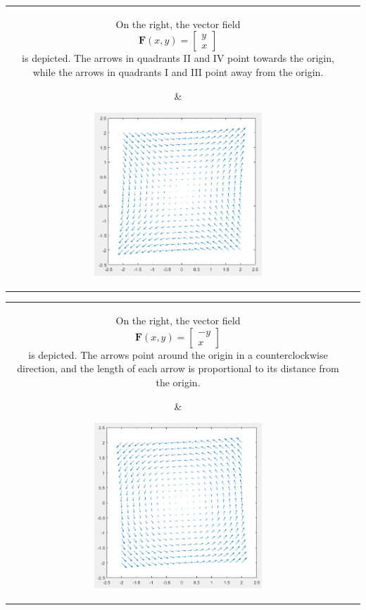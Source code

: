 \documentclass{article}
\begin{document}
\begin{tabular}{cc}
\parbox{0.5\textwidth}{
On the right, the vector field
\[\mathbf{F}(x,y) = \begin{bmatrix} y \\ x \end{bmatrix}\]
is depicted. The arrows in quadrants II and IV point towards the origin, while the arrows in quadrants I and III point away from the origin. 
} & \parbox{0.5\textwidth}{
\includegraphics[width = 0.5\textwidth]{example_vector_field_4}
}
\end{tabular}

\begin{tabular}{cc}
\parbox{0.5\textwidth}{
On the right, the vector field
\[\mathbf{F}(x,y) = \begin{bmatrix} -y \\ x \end{bmatrix}\]
is depicted. The arrows point around the origin in a counterclockwise direction, and the length of each arrow is proportional to its distance from the origin.  
} & \parbox{0.5\textwidth}{
\includegraphics[width = 0.5\textwidth]{example_vector_field_5}
}
\end{tabular}
\end{document}
